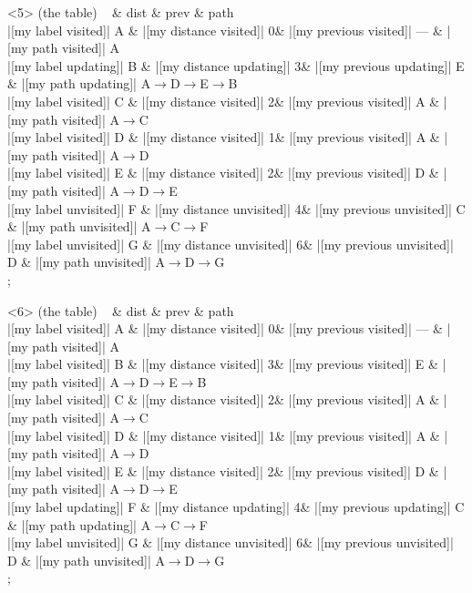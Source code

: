 \begin{visibleenv}<5>
 (the table) {
~ \& dist \& prev \& path \\
|[my label visited]| A \& |[my distance visited]| 0\& |[my previous visited]| --- \& |[my path visited]| A\\
|[my label updating]| B \& |[my distance updating]| 3\& |[my previous updating]| E \& |[my path updating]| A$\rightarrow$D$\rightarrow$E$\rightarrow$B\\
|[my label visited]| C \& |[my distance visited]| 2\& |[my previous visited]| A \& |[my path visited]| A$\rightarrow$C\\
|[my label visited]| D \& |[my distance visited]| 1\& |[my previous visited]| A \& |[my path visited]| A$\rightarrow$D\\
|[my label visited]| E \& |[my distance visited]| 2\& |[my previous visited]| D \& |[my path visited]| A$\rightarrow$D$\rightarrow$E\\
|[my label unvisited]| F \& |[my distance unvisited]| 4\& |[my previous unvisited]| C \& |[my path unvisited]| A$\rightarrow$C$\rightarrow$F\\
|[my label unvisited]| G \& |[my distance unvisited]| 6\& |[my previous unvisited]| D \& |[my path unvisited]| A$\rightarrow$D$\rightarrow$G\\
};
\end{visibleenv}
            
\begin{visibleenv}<6>
 (the table) {
~ \& dist \& prev \& path \\
|[my label visited]| A \& |[my distance visited]| 0\& |[my previous visited]| --- \& |[my path visited]| A\\
|[my label visited]| B \& |[my distance visited]| 3\& |[my previous visited]| E \& |[my path visited]| A$\rightarrow$D$\rightarrow$E$\rightarrow$B\\
|[my label visited]| C \& |[my distance visited]| 2\& |[my previous visited]| A \& |[my path visited]| A$\rightarrow$C\\
|[my label visited]| D \& |[my distance visited]| 1\& |[my previous visited]| A \& |[my path visited]| A$\rightarrow$D\\
|[my label visited]| E \& |[my distance visited]| 2\& |[my previous visited]| D \& |[my path visited]| A$\rightarrow$D$\rightarrow$E\\
|[my label updating]| F \& |[my distance updating]| 4\& |[my previous updating]| C \& |[my path updating]| A$\rightarrow$C$\rightarrow$F\\
|[my label unvisited]| G \& |[my distance unvisited]| 6\& |[my previous unvisited]| D \& |[my path unvisited]| A$\rightarrow$D$\rightarrow$G\\
};
\end{visibleenv}
            
